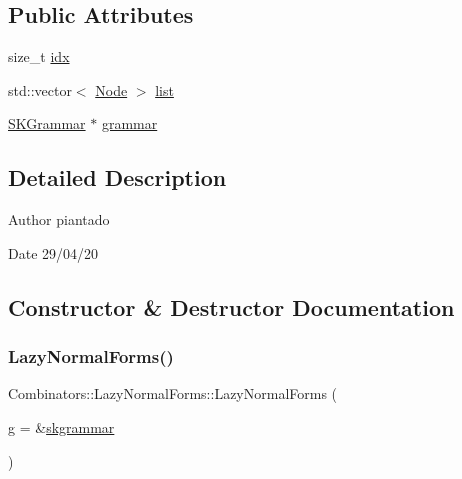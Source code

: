 \subsection*{Public Attributes}
\begin{DoxyCompactItemize}
\item 
size\+\_\+t \hyperlink{class_combinators_1_1_lazy_normal_forms_aad988f6c06e3e1cf4e516ecfc1198c7f}{idx}
\item 
std\+::vector$<$ \hyperlink{class_node}{Node} $>$ \hyperlink{class_combinators_1_1_lazy_normal_forms_aad1e727e4cdf1e6d85c79359698a756b}{list}
\item 
\hyperlink{class_combinators_1_1_s_k_grammar}{S\+K\+Grammar} $\ast$ \hyperlink{class_combinators_1_1_lazy_normal_forms_a67c0d60548475faac5485302174030e2}{grammar}
\end{DoxyCompactItemize}


\subsection{Detailed Description}
\begin{DoxyAuthor}{Author}
piantado 
\end{DoxyAuthor}
\begin{DoxyDate}{Date}
29/04/20 
\end{DoxyDate}


\subsection{Constructor \& Destructor Documentation}
\mbox{\label{class_combinators_1_1_lazy_normal_forms_ab3e10fd3a3d3611aaffbd11e6e6dd6f0}} 
\subsubsection{\texorpdfstring{Lazy\+Normal\+Forms()}{LazyNormalForms()}}
{\footnotesize\ttfamily Combinators\+::\+Lazy\+Normal\+Forms\+::\+Lazy\+Normal\+Forms (\begin{DoxyParamCaption}\item[{\hyperlink{class_combinators_1_1_s_k_grammar}{S\+K\+Grammar} $\ast$}]{g = {\ttfamily \&\hyperlink{namespace_combinators_a24aeacfa083d06000a89cb59d14eeccb}{skgrammar}} }\end{DoxyParamCaption})\hspace{0.3cm}{\ttfamily [inline]}}



